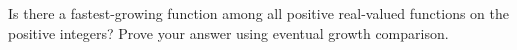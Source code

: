 Is there a fastest-growing function among all positive real-valued functions on the positive integers? Prove your answer using eventual growth comparison.
